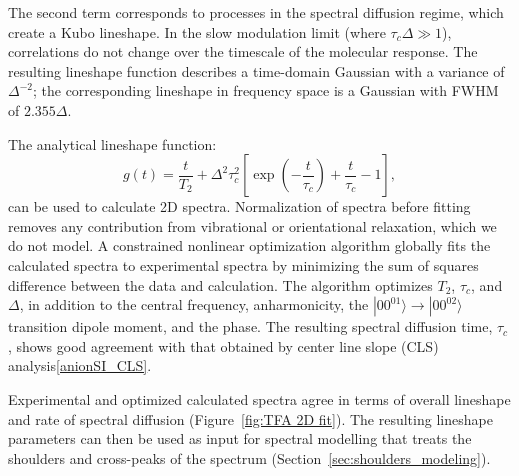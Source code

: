 {The second term corresponds to processes in the spectral diffusion regime, which create a Kubo lineshape. In the slow modulation limit (where \(\tau_c \Delta \gg 1\)), correlations do not change over the timescale of the molecular response. The resulting lineshape function describes a time-domain Gaussian with a variance of \(\Delta^{-2}\); the corresponding lineshape in frequency space is a Gaussian with FWHM of \(2.355\Delta\).

The analytical lineshape function:
\begin{equation}
  \label{eq:g(t)}
  g(t) = \frac{t}{T_2} + \Delta^2\tau_c^2 \left[ \exp{\left( -\frac{t}{\tau_c} \right)}
	+ \frac{t}{\tau_c} - 1 \right],
\end{equation}
can be used to calculate 2D spectra. Normalization of spectra before fitting removes any contribution from vibrational or orientational relaxation, which we do not model. A constrained nonlinear optimization algorithm globally fits the calculated spectra to experimental spectra by minimizing the sum of squares difference between the data and calculation. The algorithm optimizes \(T_2\), \(\tau_c\), and \(\Delta\), in addition to the central frequency, anharmonicity, the $|00^01{\rangle} \rightarrow |00^02{\rangle}$ transition dipole moment, and the phase. The resulting spectral diffusion time, \(\tau_c\), shows good agreement with that obtained by center line slope (CLS) analysis\ref{anionSI_CLS}.

Experimental and optimized calculated spectra agree in terms of overall lineshape and rate of spectral diffusion (Figure~\ref{fig:TFA 2D fit}). The resulting lineshape parameters can then be used as input for spectral modelling that treats the shoulders and cross-peaks of the spectrum (Section~\ref{sec:shoulders_modeling}).

}
